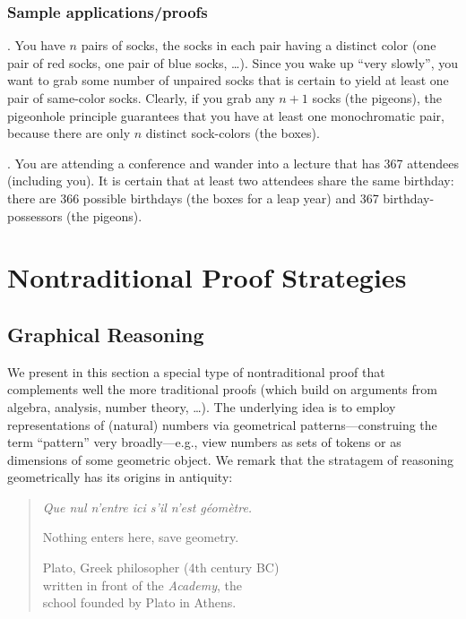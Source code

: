 \subsubsection{Sample applications/proofs}
\label{sec:pigeon-apps}

.
You have $n$ pairs of socks, the socks in each pair having a distinct
color (one pair of red socks, one pair of blue socks, \ldots).  Since
you wake up ``very slowly'', you want to grab some number of unpaired
socks that is certain to yield at least one pair of same-color socks.
Clearly, if you grab any $n+1$ socks (the pigeons), the pigeonhole
principle guarantees that you have at least one monochromatic pair,
because there are only $n$ distinct sock-colors (the boxes).

\medskip

.
You are attending a conference and wander into a lecture that has 367
attendees (including you).  It is certain that at least two attendees
share the same birthday: there are 366 possible birthdays (the boxes
for a leap year) and 367 birthday-possessors (the pigeons).



\section{Nontraditional Proof Strategies}
\label{sec:nontraditionalProofs}

\subsection{Graphical Reasoning}
\label{sec:graphicalproofs}

We present in this section a special type of nontraditional proof that
complements well the more traditional proofs (which build on arguments
from algebra, analysis, number theory, \ldots).  The underlying idea
is to employ representations of (natural) numbers via geometrical
patterns---construing the term ``pattern'' very broadly---e.g., view
numbers as sets of tokens or as dimensions of some geometric object.
We remark that the stratagem of reasoning geometrically has its
origins in antiquity:

\begin{quote}
{\it Que nul n'entre ici s'il n'est g\'eom\`etre.}

Nothing enters here, save geometry.

\hspace*{2in}Plato, Greek philosopher (4th century BC)\\
\hspace*{2in}written in front of the \textit{Academy}, the \\
\hspace*{2in}school founded by Plato in Athens. 
\end{quote}
\medskip

